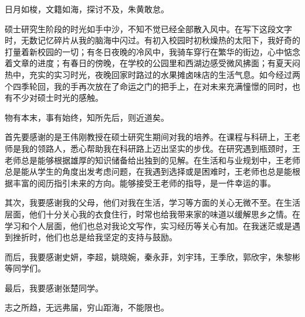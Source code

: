 \cleardoublepage
{}

日月如梭，文籍如海，探讨不及，朱黄敢怠。

硕士研究生阶段的时光如手中沙，不知不觉已经全部散入风中。在写下这段文字时，无数记忆碎片从我的脑海中闪过。有初入校园时初秋燥热的太阳下，我好奇的打量着新校园的一切；有冬日夜晚的冷风中，我骑车穿行在繁华的街边，心中惦念着文章的进度；有春日的傍晚，在学校的公园里和西湖边感受微风拂面；有夏天闷热中，充实的实习时光，夜晚回家时路过的水果摊卤味店的生活气息。如今经过两个四季轮回，我的手再次放在了命运之门的把手上，在对未来充满憧憬的同时，也有不少对硕士时光的感触。

物有本末，事有始终，知所先后，则近道矣。

首先要感谢的是王伟刚教授在硕士研究生期间对我的培养。在课程与科研上，王老师是我的领路人，悉心帮助我在科研路上迈出坚实的步伐。在研究遇到瓶颈时，王老师总是能够根据雄厚的知识储备给出独到的见解。在生活和与业规划中，王老师总是能从学生的角度出发考虑问题，在我遇到选择或是困难时，王老师也总是能根据丰富的阅历指引未来的方向。能够接受王老师的指导，是一件幸运的事。

其次，我要感谢我的父母，他们对我在生活，学习等方面的关心无微不至。在生活层面，他们十分关心我的衣食住行，时常也给我带来家的味道以缓解思乡之情。在学习和个人层面，他们也总对我论文写作，实习经历等关心有加。在我迷茫或是遇到挫折时，他们也总是给我坚定的支持与鼓励。

而后，我要感谢史妍，李超，姚晓婉，秦永菲，刘宇玮，王季欣，郭欣宇，朱黎彬等同学们。

最后，我要感谢张楚同学。


志之所趋，无远弗届，穷山距海，不能限也。

\newpage